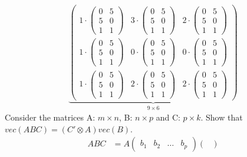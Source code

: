 \begin{enumerate}
\begin{solution}
\begin{align*}
                  \underbrace{\begin{pmatrix} 1\cdot\begin{pmatrix}0&5\\5&0\\1&1 \end{pmatrix}&3\cdot\begin{pmatrix}0&5\\5&0\\1&1 \end{pmatrix}&2\cdot\begin{pmatrix}0&5\\5&0\\1&1 \end{pmatrix}\\1\cdot\begin{pmatrix}0&5\\5&0\\1&1 \end{pmatrix}&0\cdot\begin{pmatrix}0&5\\5&0\\1&1 \end{pmatrix}&0\cdot\begin{pmatrix}0&5\\5&0\\1&1 \end{pmatrix}\\1\cdot\begin{pmatrix}0&5\\5&0\\1&1 \end{pmatrix}&2\cdot\begin{pmatrix}0&5\\5&0\\1&1 \end{pmatrix}&2\cdot\begin{pmatrix}0&5\\5&0\\1&1 \end{pmatrix}  \end{pmatrix}}_{9\times6}
              \end{align*}
              Consider the matrices A: $m\times n$, B: $n\times p$ and C: $p\times k$. Show that $vec(ABC)=\left(C'\otimes A\right) vec(B)$.
              \begin{align*}
                  ABC & = A \begin{pmatrix} b_1 & b_2 & \dots & b_p \end{pmatrix}
                  \begin{pmatrix}

\end{pmatrix}
\end{align*}
\end{solution}
\end{enumerate}
